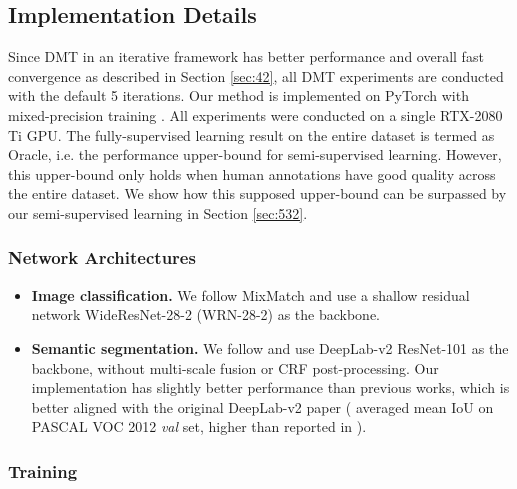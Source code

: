 \documentclass[preprint,review,10pt]{elsarticle}
\begin{document}
\subsection{Implementation Details}
\label{sec:52}
Since DMT in an iterative framework has better performance and overall fast convergence as described in Section \ref{sec:42}, all DMT experiments are conducted with the default 5 iterations. Our method is implemented on PyTorch with mixed-precision training \cite{DBLP:conf/iclr/MicikeviciusNAD18}. All experiments were conducted on a single RTX-2080 Ti GPU. The fully-supervised learning result on the entire dataset is termed as Oracle, i.e. the performance upper-bound for semi-supervised learning. However, this upper-bound only holds when human annotations have good quality across the entire dataset. We show how this supposed upper-bound can be surpassed by our semi-supervised learning in Section \ref{sec:532}.


\subsubsection{Network Architectures}
\label{sec:521}

\begin{itemize}
    \item \textbf{Image classification.} We follow MixMatch \cite{berthelot2020remixmatch} and use a shallow residual network WideResNet-28-2 (WRN-28-2) \cite{zagoruyko2016wide} as the backbone.
    \item \textbf{Semantic segmentation.} We follow \cite{mittal2019semi,hung} and use DeepLab-v2 ResNet-101 \cite{deeplabv2} as the backbone, without multi-scale fusion or CRF post-processing. Our implementation has slightly better performance than previous works, which is better aligned with the original DeepLab-v2 paper ( averaged mean IoU on PASCAL VOC 2012 \textit{val} set, higher than  reported in \cite{hung}).
\end{itemize}

\subsubsection{Training}
\label{sec:522}
\end{document}
